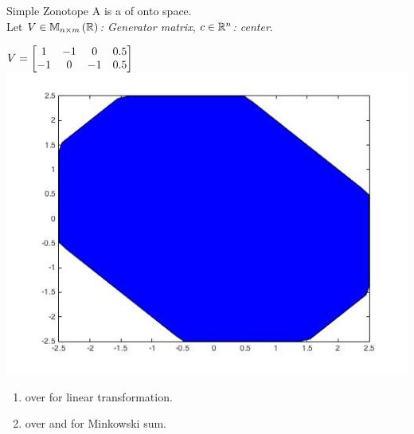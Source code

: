 
\begin{frame}{Simple Zonotope}
A  is a  of 
onto  space.\\[0.5em]
%
Let  \emph{ $V\in\mathbb{M}_{n\times m}\left(\mathbb{R}\right)$: Generator matrix},
 \emph{$c\in\mathbb{R}^n$: center}.
\begin{block}{}
%
\end{block}
%
\vspace{0.5em}
%
\begin{minipage}{0.43\textwidth}
{\scriptsize $V=\left[\begin{matrix}1 &   -1 &          0 &    0.5 \\
   -1 &         0 &   -1 &    0.5\end{matrix}\right]$}
\includegraphics[scale=0.25]{figures/CZtopes/RealZonotope.jpg}
\end{minipage}
%
\vline
%
\begin{minipage}{0.55\textwidth}
\begin{enumerate}
\item {} over  for linear transformation.
%
\eqnemph{\[
A\rztope{\ptemp}{\cen}=\rztope{A\ptemp}{A\cen}.
\]}
%
\vspace{-2em}
\item {} over  and  for Minkowski sum.
%
%
\end{enumerate}
%
\end{minipage}
%
\end{frame}

